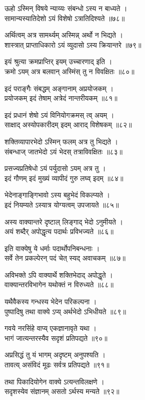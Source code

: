 ऊहो ऽस्मिन् विषये न्याय्यः संबन्धो ऽस्य न बाध्यते ।\\सामान्यस्यातिदेशो ऽयं विशेषो ऽत्रातिदिश्यते ॥७८॥

अर्थित्वम् अत्र सामर्थ्यम् अस्मिन्न् अर्थो न भिद्यते ।\\शास्त्रात् प्राप्ताधिकारो ऽयं व्युदासो ऽस्य क्रियान्तरे ॥७९॥

इयं श्रुत्या क्रमप्राप्तिर् इयम् उच्चारणाद् इति ।\\क्रमो ऽयम् अत्र बलवान् अस्मिंस् तु न विवक्षितः ॥८०॥

इदं पराङ्गैः संबद्धम् अङ्गानाम् अप्रयोजकम् ।\\प्रयोजकम् इदं तेषाम् अत्रेदं नान्तरीयकम् ॥८१॥

इदं प्रधानं शेषो ऽयं विनियोगक्रमस् त्व् अयम् ।\\साक्षाद् अस्योपकारीदम् इदम् आराद् विशेषकम् ॥८२॥

शक्तिव्यापारभेदो ऽस्मिन् फलम् अत्र तु भिद्यते ।\\संबन्धाज् जातभेदो ऽयं भेदस् तत्राविवक्षितः ॥८३॥

प्रसज्यप्रतिषेधो ऽयं पर्युदासो ऽयम् अत्र तु ।\\इदं गौणम् इदं मुख्यं व्यापीदं गुरु लघ्व् इदम् ॥८४॥

भेदेनाङ्गाङ्गिभावो ऽस्य बहुभेदं विकल्प्यते ।\\इदं नियम्यते ऽस्यात्र योग्यत्वम् उपजायते ॥८५॥

अस्य वाक्यान्तरे दृष्टाल् लिङ्गाद् भेदो ऽनुमीयते ।\\अयं शब्दैर् अपोद्धृत्य पदार्थः प्रविभज्यते ॥८६॥

इति वाक्येषु ये धर्माः पदार्थोपनिबन्धनाः ।\\सर्वे तेन प्रकल्पेरन् पदं चेत् स्यद् अवाचकम् ॥८७॥

अविभक्ते ऽपि वाक्यार्थे शक्तिभेदाद् अपोद्धृते ।\\वाक्यान्तरविभागेन यथोक्तं न विरुध्यते ॥८८॥

यथैवैकस्य गन्धस्य भेदेन परिकल्पना ।\\पुष्पादिषु तथा वाक्ये ऽप्य् अर्थभेदो ऽभिधीयते ॥८९॥

गवये नरसिंहे वाप्य् एकज्ञानावृते यथा ।\\भागं जात्यन्तरस्यैव सदृशं प्रतिपद्यते ॥९०॥

अप्रसिद्धं तु यं भागम् अदृष्टम् अनुपश्यति ।\\तावत्य् असंविदं मूढः सर्वत्र प्रतिपद्यते ॥९१॥

तथा पिकादियोगेन वाक्ये ऽत्यन्तविलक्षणे ।\\सदृशस्येव संज्ञानम् असतो ऽर्थस्य मन्यते ॥९२॥

